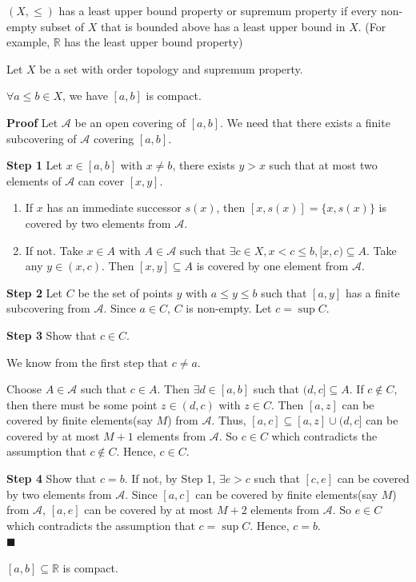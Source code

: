\documentclass[main.tex]{subfiles}
\begin{document}
\begin{definition}
    $(X, \le )$ has a least upper bound property or supremum property if every non-empty subset of $X$ that is bounded above has a least upper bound in $X$. (For example, $\mathbb{R}$ has the least upper bound property)
\end{definition}

\par Let $X$ be a set with order topology and supremum property. 

\begin{theorem}
    $\forall a \le b \in X$, we have $[a, b]$ is compact. 
\end{theorem}
\par \noindent \textbf{Proof} Let $\mathcal{A}$ be an open covering of $[a, b]$. We need that there exists a finite subcovering of $\mathcal{A}$ covering $[a, b]$. 
\par \noindent \textbf{Step 1} Let $x\in [a, b]$ with $x \neq b$, there exists $y > x$ such that at most two elements of $\mathcal{A}$ can cover $[x, y]$. 
\begin{enumerate}
    \item If $x$ has an immediate successor $s(x)$, then $[x, s(x)] = \{x, s(x)\}$ is covered by two elements from $ \mathcal{A}$. 
    \item If not. Take $ x\in A$ with $A \in \mathcal{A}$ such that $\exists c\in X, x < c \le b, [x, c) \subseteq A$. Take any $y \in (x, c)$. Then $[x, y] \subseteq A$ is covered by one element from $\mathcal{A}$. 
\end{enumerate} 
\par \noindent \textbf{Step 2} Let $C$ be the set of points $y$ with $a\le y\le b$ such that $[a, y]$ has a finite subcovering from $\mathcal{A}$. Since $a \in C$, $C$ is non-empty. Let $c = \sup C$. 
\par \noindent \textbf{Step 3} Show that $c\in C$. 
\par We know from the first step that $c \neq a$. 
\par Choose $A\in \mathcal{A}$ such that $c\in A$. Then $\exists d \in [a, b]$ such that $(d, c] \subseteq A$. If $c\notin C$, then there must be some point $z \in (d, c)$ with $z \in C$. Then $[a, z]$ can be covered by finite elements(say $M$) from $\mathcal{A}$. Thus, $[a, c] \subseteq [a, z] \cup (d, c]$ can be covered by at most $M + 1$ elements from $\mathcal{A}$. So $c\in C$ which contradicts the assumption that $c \notin C$. Hence, $c\in C$. 
\par \noindent \textbf{Step 4} Show that $c = b$. If not, by Step 1, $\exists e > c$ such that $[c, e]$ can be covered by two elements from $\mathcal{A}$. Since $[a, c]$ can be covered by finite elements(say $M$) from $\mathcal{A}$, $[a, e]$ can be covered by at most $M + 2$ elements from $\mathcal{A}$. So $e\in C$ which contradicts the assumption that $c = \sup C$. Hence, $c = b$.  
\mbox{} \\ \null \hfill $\blacksquare$ 
\begin{corollary}
    $[a, b] \subseteq \mathbb{R}$ is compact. 
\end{corollary}
\end{document}
